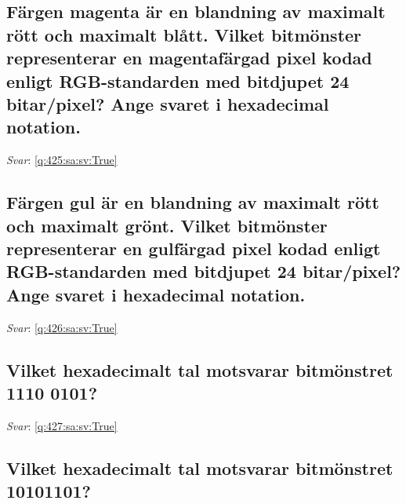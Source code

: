 \documentclass[a4paper,11pt,oneside]{article}
\begin{document}
\begin{sloppypar}
\subsection{F\"argen magenta \"ar en blandning av maximalt r\"ott och maximalt bl\r{a}tt. Vilket bitm\"onster representerar en magentaf\"argad pixel kodad enligt RGB-standarden med bitdjupet 24 bitar/pixel? Ange svaret i hexadecimal notation.}

\label{q:425:sa:sv:False}

\vspace{2cm}

\noindent\makebox[\textwidth]{\hrulefill}

\vspace{1cm}

\textit{Svar}: \autoref{q:425:sa:sv:True}



\subsection{F\"argen gul \"ar en blandning av maximalt r\"ott och maximalt gr\"ont. Vilket bitm\"onster representerar en gulf\"argad pixel kodad enligt RGB-standarden med bitdjupet 24 bitar/pixel? Ange svaret i hexadecimal notation.}

\label{q:426:sa:sv:False}

\vspace{2cm}

\noindent\makebox[\textwidth]{\hrulefill}

\vspace{1cm}

\textit{Svar}: \autoref{q:426:sa:sv:True}



\subsection{Vilket hexadecimalt tal motsvarar bitm\"onstret 1110 0101?}

\label{q:427:sa:sv:False}

\vspace{2cm}

\noindent\makebox[\textwidth]{\hrulefill}

\vspace{1cm}

\textit{Svar}: \autoref{q:427:sa:sv:True}



\subsection{Vilket hexadecimalt tal motsvarar bitm\"onstret 10101101?}


\end{sloppypar}
\end{document}
